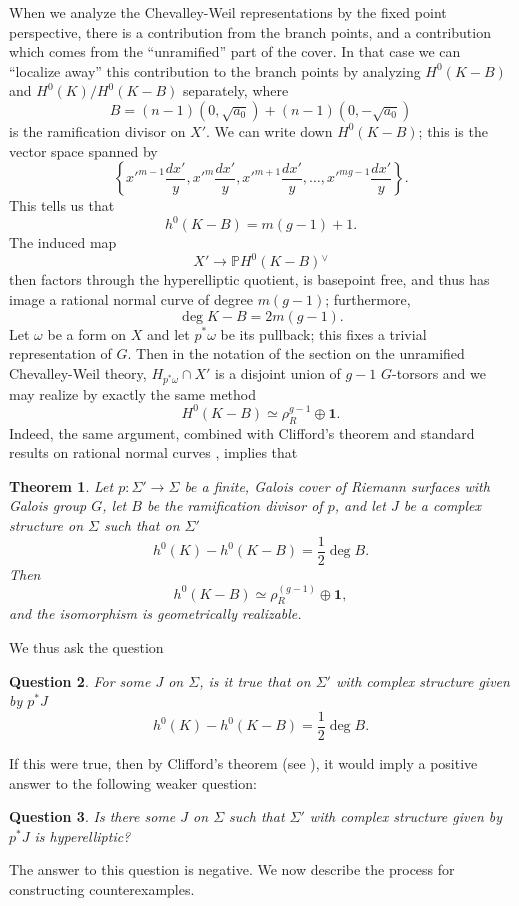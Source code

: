 \documentclass[11pt]{amsart}
\newtheorem{thm}{Theorem}
\newtheorem{quest}[thm]{Question}
\numberwithin{thm}{section}
\begin{document}
When we analyze the Chevalley-Weil representations by the fixed point perspective, there is a contribution from the branch points, and a contribution which comes from the ``unramified'' part of the cover.  In that case we can ``localize away'' this contribution to the branch points by analyzing $H^0(K-B)$ and $H^0(K)/H^0(K-B)$ separately, where
\[
B = (n-1)(0, \sqrt{a_0}) + (n-1)(0,-\sqrt{a_0})
\]
is the ramification divisor on $X'$.  We can write down $H^0(K-B)$; this is the vector space spanned by
\[
\left\{x'^{m-1}\frac{dx'}{y}, x'^m\frac{dx'}{y}, x'^{m+1} \frac{dx'}{y}, \dots, x'^{mg-1}\frac{dx'}{y}\right\}.
\]
This tells us that
\[
h^0(K-B) = m(g-1) + 1.
\]
The induced map
\[
X'\rightarrow \mathbb{P}H^0(K-B){^\vee}
\]
then factors through the hyperelliptic quotient, is basepoint free, and thus has image a rational normal curve of degree $m(g-1)$; furthermore, 
\[
\deg K - B = 2m(g-1).
\]
Let $\omega$ be a form on $X$ and let $p^*\omega$ be its pullback; this fixes a trivial representation of $G$.  Then in the notation of the section on the unramified Chevalley-Weil theory, $H_{p^*\omega} \cap X'$ is a disjoint union of $g-1$ $G$-torsors and we may realize by exactly the same method
\[
H^0(K-B) \simeq \rho_R^{g-1} \oplus \mathbf{1}.
\]
Indeed, the same argument, combined with Clifford's theorem and standard results on rational normal curves \cite{ACGH}, implies that 
\begin{thm}
Let $p: \Sigma'\rightarrow \Sigma$ be a finite, Galois cover of Riemann surfaces with Galois group $G$, let $B$ be the ramification divisor of $p$, and let $J$ be a complex structure on $\Sigma$ such that on $\Sigma'$
\[
h^0(K) - h^0(K-B) = \frac{1}{2}\deg B.
\]
Then
\[
h^0(K-B) \simeq \rho_R^{(g-1)} \oplus \mathbf{1},
\]
and the isomorphism is geometrically realizable.
\end{thm}
We thus ask the question
\begin{quest}
For some  $J$ on $\Sigma$, is it true that on $\Sigma'$ with complex structure given by $p^*J$ \[h^0(K) - h^0(K-B) = \frac{1}{2}\deg B.\]
\end{quest}
If this were true, then by Clifford's theorem (see \cite{ACGH}), it would imply a positive answer to the following weaker question:
\begin{quest}\label{quest:hyperell}
Is there some $J$ on $\Sigma$ such that $\Sigma'$ with complex structure given by $p^*J$ is hyperelliptic?
\end{quest}
The answer to this question is negative.  We now describe the process for constructing counterexamples.
\end{document}
